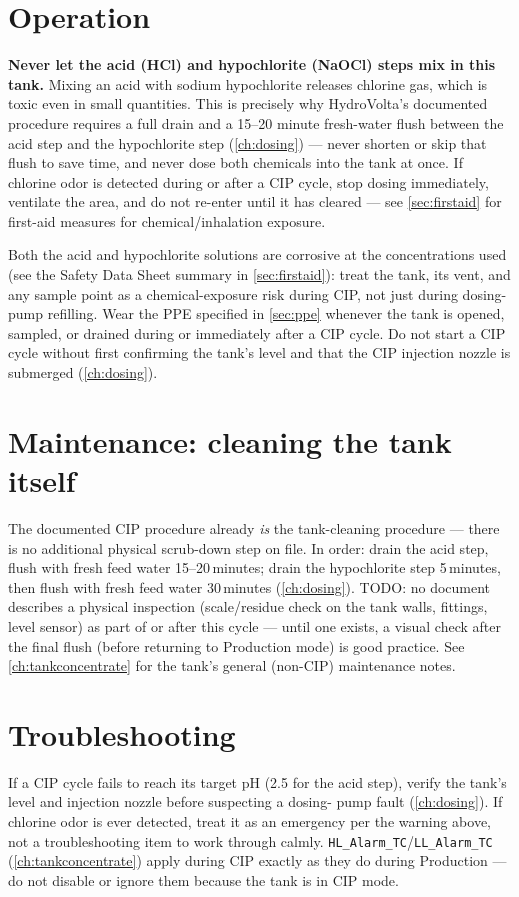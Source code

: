 \documentclass[a4paper,11pt,twoside,openright,numbers=noenddot]{scrreprt}
\newcommand{\plctag}[1]{\texttt{\small #1}}
\begin{document}
\section{Operation}
\begin{danger}
\textbf{Never let the acid (HCl) and hypochlorite (NaOCl) steps mix in
this tank.} Mixing an acid with sodium hypochlorite releases chlorine
gas, which is toxic even in small quantities. This is precisely why
HydroVolta's documented procedure requires a full drain and a 15--20
minute fresh-water flush between the acid step and the hypochlorite step
(\cref{ch:dosing}) --- never shorten or skip that flush to save time, and
never dose both chemicals into the tank at once. If chlorine odor is
detected during or after a CIP cycle, stop dosing immediately, ventilate
the area, and do not re-enter until it has cleared --- see
\cref{sec:firstaid} for first-aid measures for chemical/inhalation
exposure.
\end{danger}
Both the acid and hypochlorite solutions are corrosive at the
concentrations used (see the Safety Data Sheet summary in
\cref{sec:firstaid}): treat the tank, its vent, and any sample point as a
chemical-exposure risk during CIP, not just during dosing-pump refilling.
Wear the PPE specified in \cref{sec:ppe} whenever the tank is opened,
sampled, or drained during or immediately after a CIP cycle. Do not start
a CIP cycle without first confirming the tank's level and that the CIP
injection nozzle is submerged (\cref{ch:dosing}).

\section{Maintenance: cleaning the tank itself}
The documented CIP procedure already \emph{is} the tank-cleaning
procedure --- there is no additional physical scrub-down step on file. In
order: drain the acid step, flush with fresh feed water
15--20\,minutes; drain the hypochlorite step 5\,minutes, then flush with
fresh feed water 30\,minutes (\cref{ch:dosing}). TODO: no document
describes a physical inspection (scale/residue check on the tank walls,
fittings, level sensor) as part of or after this cycle --- until one
exists, a visual check after the final flush (before returning to
Production mode) is good practice. See \cref{ch:tankconcentrate} for the
tank's general (non-CIP) maintenance notes.

\section{Troubleshooting}
If a CIP cycle fails to reach its target pH (2.5 for the acid step),
verify the tank's level and injection nozzle before suspecting a dosing-
pump fault (\cref{ch:dosing}). If chlorine odor is ever detected, treat it
as an emergency per the warning above, not a troubleshooting item to work
through calmly. \plctag{HL\_Alarm\_TC}/\plctag{LL\_Alarm\_TC}
(\cref{ch:tankconcentrate}) apply during CIP exactly as they do during
Production --- do not disable or ignore them because the tank is in CIP
mode.
\end{document}
